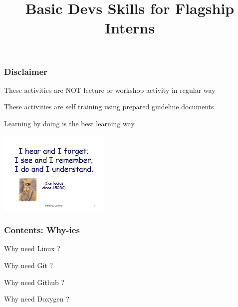 \documentclass[table,dvipsnames]{beamer}
\title[Devs Beginner Guide]{Basic Devs Skills for Flagship Interns}
\author{}
\date{}
\begin{document}
	\begin{frame}
	\titlepage
	\end{frame}

	\begin{frame}
		\frametitle{Disclaimer}
		\begin{exampleblock}{}
			These activities are NOT lecture or workshop activity in regular way
		\end{exampleblock}
		\begin{exampleblock}{}
			These activities are self training using prepared guideline documents 	
		\end{exampleblock}
		\begin{exampleblock}{}
			Learning by doing is the best learning way
			\begin{center}
				\includegraphics[width=150pt]{images/confucius}
			\end{center}
		\end{exampleblock}
	\end{frame}

	\begin{frame}
		\frametitle{Contents: Why-ies}
		\begin{exampleblock}{}
			Why need Linux ?
		\end{exampleblock}
		\begin{exampleblock}{}
			Why need Git ?
		\end{exampleblock}
		\begin{exampleblock}{}
			Why need Github ?
		\end{exampleblock}
		\begin{exampleblock}{}
			Why need Doxygen ?
		\end{exampleblock}
	\end{frame}	
\end{document}
